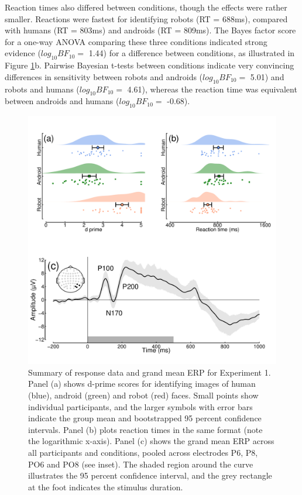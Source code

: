 \documentclass[
]{article}
\begin{document}
Reaction times also differed between conditions, though the effects were rather smaller. Reactions were fastest for identifying robots (RT = 688ms), compared with humans (RT = 803ms) and androids (RT = 809ms). The Bayes factor score for a one-way ANOVA comparing these three conditions indicated strong evidence (\(log_{10}BF_{10} =\) 1.44) for a difference between conditions, as illustrated in Figure \ref{fig:RobotsData}b. Pairwise Bayesian t-tests between conditions indicate very convincing differences in sensitivity between robots and androids (\(log_{10}BF_{10} =\) 5.01) and robots and humans (\(log_{10}BF_{10} =\) 4.61), whereas the reaction time was equivalent between androids and humans (\(log_{10}BF_{10} =\) -0.68).

\begin{figure}

{\centering \includegraphics{Figures/RobotsData} 

}

\caption{Summary of response data and grand mean ERP for Experiment 1. Panel (a) shows d-prime scores for identifying images of human (blue), android (green) and robot (red) faces. Small points show individual participants, and the larger symbols with error bars indicate the group mean and bootstrapped 95 percent confidence intervals. Panel (b) plots reaction times in the same format (note the logarithmic x-axis). Panel (c) shows the grand mean ERP across all participants and conditions, pooled across electrodes P6, P8, PO6 and PO8 (see inset). The shaded region around the curve illustrates the 95 percent confidence interval, and the grey rectangle at the foot indicates the stimulus duration.}\label{fig:RobotsData}
\end{figure}
\end{document}
